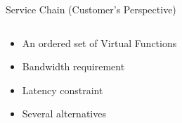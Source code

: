 \begin{frame}{Service Chain \small (Customer's Perspective)}
\begin{columns}
\begin{column}{.6\textwidth}
\begin{itemize}[<+>]
  \item An ordered set of Virtual Functions
  \item Bandwidth requirement
  \item Latency constraint
  \item Several alternatives
\end{itemize}
\end{column}
\begin{column}{.4\textwidth}
\begin{center}

\end{center}
\end{column}
\end{columns}
\end{frame}